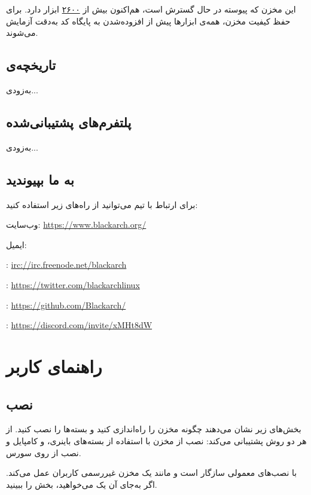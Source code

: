 \documentclass[a4paper, oneside, 11pt]{book}
\begin{document}
این مخزن که پیوسته در حال گسترش است، هم‌اکنون بیش از
\href{https://www.blackarch.org/tools.html}{۲۶۰۰} ابزار دارد.
برای حفظ کیفیت مخزن، همه‌ی ابزارها پیش از افزوده‌شدن به پایگاه کد
به‌دقت آزمایش می‌شوند.

\section{تاریخچه‌ی }
به‌زودی...

\section{پلتفرم‌های پشتیبانی‌شده}
به‌زودی...

\section{به ما بپیوندید}
برای ارتباط با تیم  می‌توانید از راه‌های زیر استفاده کنید:

وب‌سایت: \url{https://www.blackarch.org/}

ایمیل: \href{mailto:team@blackarch.org}{}

: \url{irc://irc.freenode.net/blackarch}

: \url{https://twitter.com/blackarchlinux}

: \url{https://github.com/Blackarch/}

: \url{https://discord.com/invite/xMHt8dW}



\chapter{راهنمای کاربر}

\section{نصب}
بخش‌های زیر نشان می‌دهند چگونه مخزن  را راه‌اندازی کنید و بسته‌ها را
نصب کنید.  از هر دو روش پشتیبانی می‌کند: نصب از مخزن با استفاده از
بسته‌های باینری، و کامپایل و نصب از روی سورس.

 با نصب‌های معمولی  سازگار است و مانند یک مخزن غیررسمی کاربران
عمل می‌کند. اگر به‌جای آن یک  می‌خواهید، بخش
\href{https://www.blackarch.org/downloads.html#iso}{} را ببینید.
\end{document}
